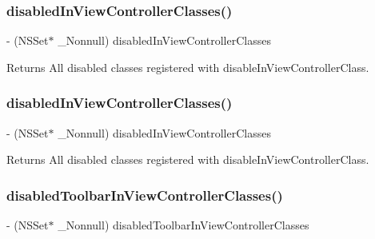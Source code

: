 \subsubsection{\texorpdfstring{disabled\+In\+View\+Controller\+Classes()}{disabledInViewControllerClasses()}\hspace{0.1cm}{\footnotesize\ttfamily [2/3]}}
{\footnotesize\ttfamily -\/ (N\+S\+Set$\ast$ \+\_\+\+Nonnull) disabled\+In\+View\+Controller\+Classes \begin{DoxyParamCaption}{ }\end{DoxyParamCaption}}

Returns All disabled classes registered with disable\+In\+View\+Controller\+Class. \mbox{\label{interface_i_q_keyboard_manager_a3549c4c0b46b18854a0c3467276c0e3a}} 
\subsubsection{\texorpdfstring{disabled\+In\+View\+Controller\+Classes()}{disabledInViewControllerClasses()}\hspace{0.1cm}{\footnotesize\ttfamily [3/3]}}
{\footnotesize\ttfamily -\/ (N\+S\+Set$\ast$ \+\_\+\+Nonnull) disabled\+In\+View\+Controller\+Classes \begin{DoxyParamCaption}{ }\end{DoxyParamCaption}}

Returns All disabled classes registered with disable\+In\+View\+Controller\+Class. \mbox{\label{interface_i_q_keyboard_manager_a4ddc098b0159752d9e935ceb97fe7f8c}} 
\subsubsection{\texorpdfstring{disabled\+Toolbar\+In\+View\+Controller\+Classes()}{disabledToolbarInViewControllerClasses()}\hspace{0.1cm}{\footnotesize\ttfamily [1/3]}}
{\footnotesize\ttfamily -\/ (N\+S\+Set$\ast$ \+\_\+\+Nonnull) disabled\+Toolbar\+In\+View\+Controller\+Classes \begin{DoxyParamCaption}{ }\end{DoxyParamCaption}}

